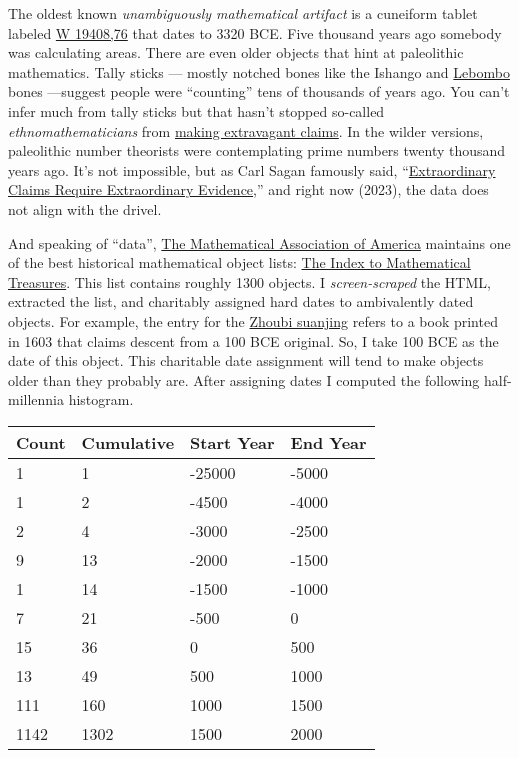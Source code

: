 The oldest known \emph{unambiguously mathematical artifact} is a
cuneiform tablet labeled
\href{https://cdli.mpiwg-berlin.mpg.de/artifacts/3118}{W 19408,76} that
dates to 3320 BCE. Five thousand years ago somebody was calculating
areas. There are even older objects that hint at paleolithic
mathematics. Tally sticks --- mostly notched bones like the Ishango and
\href{https://www.pnas.org/doi/full/10.1073/pnas.1204213109}{Lebombo}
bones ---suggest people were ``counting'' tens of thousands of years
ago. You can't infer much from tally sticks but that hasn't stopped
so-called \emph{ethnomathematicians} from
\href{https://afrolegends.com/2013/08/29/the-ishango-bone-craddle-of-mathematics/}{making
extravagant claims}. In the wilder versions, paleolithic number
theorists were contemplating prime numbers twenty thousand years ago.
It's not impossible, but as Carl Sagan famously said,
``\href{https://effectiviology.com/sagan-standard-extraordinary-claims-require-extraordinary-evidence/}{Extraordinary
Claims Require Extraordinary Evidence},'' and right now (2023), the data
does not align with the drivel.

And speaking of ``data'', \href{https://www.maa.org/}{The Mathematical
Association of America} maintains one of the best historical
mathematical object lists:
\href{https://www.maa.org/press/periodicals/convergence/index-to-mathematical-treasures}{The
Index to Mathematical Treasures}. This list contains roughly 1300
objects. I \emph{screen-scraped} the HTML, extracted the list, and
charitably assigned hard dates to ambivalently dated objects. For
example, the entry for the
\href{https://www.maa.org/press/periodicals/convergence/mathematical-treasures-zhoubi-suanjing}{Zhoubi
suanjing} refers to a book printed in 1603 that claims descent from a
100 BCE original. So, I take 100 BCE as the date of this object. This
charitable date assignment will tend to make objects older than they
probably are. After assigning dates I computed the following
half-millennia histogram.

\begin{longtable}[]{@{}llll@{}}
\toprule
Count & Cumulative & Start Year & End Year \\
\midrule
\endhead
1 & 1 & -25000 & -5000 \\
1 & 2 & -4500 & -4000 \\
2 & 4 & -3000 & -2500 \\
9 & 13 & -2000 & -1500 \\
1 & 14 & -1500 & -1000 \\
7 & 21 & -500 & 0 \\
15 & 36 & 0 & 500 \\
13 & 49 & 500 & 1000 \\
111 & 160 & 1000 & 1500 \\
1142 & 1302 & 1500 & 2000 \\
\bottomrule
\end{longtable}

